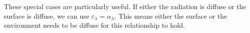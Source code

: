 These special cases are particularly useful. If either the radiation is diffuse or the surface is diffuse, we can use $\varepsilon_{\lambda} = \alpha_{\lambda}$. This means either the surface or the environment needs to be diffuse for this relationship to hold.
%





